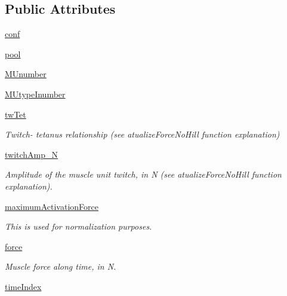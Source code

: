 \subsection*{Public Attributes}
\begin{DoxyCompactItemize}
\item 
\hyperlink{class_muscle_no_hill_1_1_muscle_no_hill_a766382d5bd77328ab5c39eec6eb163f4}{conf}
\item 
\hyperlink{class_muscle_no_hill_1_1_muscle_no_hill_a93bd043a0b802af9268873b1d2a4cc57}{pool}
\item 
\hyperlink{class_muscle_no_hill_1_1_muscle_no_hill_ae2a6a4b782c8abea0bb581b2d133f064}{M\+Unumber}
\item 
\hyperlink{class_muscle_no_hill_1_1_muscle_no_hill_ab69c47ef7b07407562fc0b9fa65bacf0}{M\+Utype\+Inumber}
\item 
\hyperlink{class_muscle_no_hill_1_1_muscle_no_hill_a29798f6bca2f69e68f1421847d5327d8}{tw\+Tet}
\begin{DoxyCompactList}\small\item\em Twitch-\/ tetanus relationship (see atualize\+Force\+No\+Hill function explanation) \end{DoxyCompactList}\item 
\hyperlink{class_muscle_no_hill_1_1_muscle_no_hill_aeb5782fa0602e372c6fa6d42abdd9ee6}{twitch\+Amp\+\_\+N}
\begin{DoxyCompactList}\small\item\em Amplitude of the muscle unit twitch, in N (see atualize\+Force\+No\+Hill function explanation). \end{DoxyCompactList}\item 
\hyperlink{class_muscle_no_hill_1_1_muscle_no_hill_aab0ae54c579e456837c8b149a212ee5f}{maximum\+Activation\+Force}
\begin{DoxyCompactList}\small\item\em This is used for normalization purposes. \end{DoxyCompactList}\item 
\hyperlink{class_muscle_no_hill_1_1_muscle_no_hill_a544fe8a564e9b28395206ee6bd9eda9a}{force}
\begin{DoxyCompactList}\small\item\em Muscle force along time, in N. \end{DoxyCompactList}\item 
\hyperlink{class_muscle_no_hill_1_1_muscle_no_hill_a8dc677d638584602a8de38305dd631ef}{time\+Index}
\end{DoxyCompactItemize}


